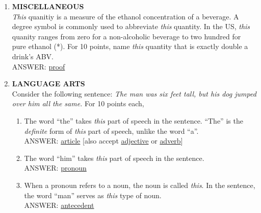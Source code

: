 \documentclass{report}
\newcommand*{\backtrack}{\setcounter{enumi}{\numexpr\theenumi-1\relax}}
\begin{document}
\begin{enumerate}
    \item \textbf{MISCELLANEOUS} \\ \textit{This} quanitiy is a measure of the ethanol concentration of a beverage. A degree symbol is commonly used to abbreviate \textit{this} quantity. In the US, \textit{this} quanity ranges from zero for a non-alcoholic beverage to two hundred for pure ethanol (*). For 10 points, name \textit{this} quantity that is exactly double a drink's ABV. \\ ANSWER: \underline{proof} \backtrack
    \item \textbf{LANGUAGE ARTS} \\ Consider the following sentence: \textit{The man was six feet tall, but his dog jumped over him all the same.} For 10 points each,
    \begin{enumerate}[label=\Alph*]
        \item The word ``the'' takes \textit{this} part of speech in the sentence. ``The'' is the \textit{definite} form of \textit{this} part of speech, unlike the word ``a''.\\ ANSWER: \underline{article} [also accept \underline{adjective} or \underline{adverb}]
        \item The word ``him'' takes \textit{this} part of speech in the sentence. \\ ANSWER: \underline{pronoun}
        \item When a pronoun refers to a noun, the noun is called \textit{this}. In the sentence, the word ``man'' serves as \textit{this} type of noun. \\ ANSWER: \underline{antecedent}
    \end{enumerate}


\end{enumerate}
\end{document}
